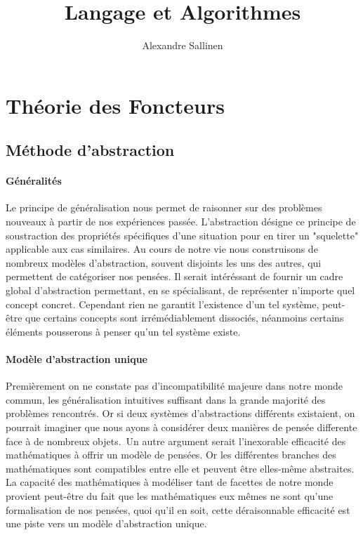 \documentclass[10pt,b5paper, french]{book}
\author{Alexandre Sallinen}
\title{Langage et Algorithmes}
\begin{document}
\maketitle	

\tableofcontents

\chapter{Théorie des Foncteurs}

\section{Méthode d'abstraction}
\subsubsection{Généralités}

Le principe de généralisation nous permet de raisonner sur des problèmes nouveaux à partir de nos expériences passée. L'abstraction désigne ce principe de soustraction des propriétés spécifiques d'une situation pour en tirer un "squelette" applicable aux cas similaires. Au cours de notre vie nous construisons de nombreux modèles d'abstraction, souvent disjoints les uns des autres, qui permettent de catégoriser nos pensées. Il serait intéréssant de fournir un cadre global d'abstraction permettant, en se spécialisant, de représenter n'importe quel concept concret. Cependant rien ne garantit l'existence d'un tel système, peut-être que certains concepts sont irrémédiablement dissociés, néanmoins certains éléments pousserons à penser qu'un tel système existe. 

\subsubsection{Modèle d'abstraction unique}

Premièrement on ne constate pas d'incompatibilité majeure dans notre monde commun, les généralisation intuitives suffisant dans la grande majorité des problèmes rencontrés. Or si deux systèmes d'abstractions différents existaient, on pourrait imaginer que nous ayons à considérer deux manières de pensée differente face à de nombreux objets.\
Un autre argument serait l'inexorable efficacité des mathématiques à offrir un modèle de pensées. Or les différentes branches des mathématiques sont compatibles entre elle et peuvent être elles-même abstraites. La capacité des mathématiques à modéliser tant de facettes de notre monde provient peut-être du fait que les mathématiques eux mêmes ne sont qu'une formalisation de nos pensées, quoi qu'il en soit, cette déraisonnable efficacité est une piste vers un modèle d'abstraction unique.
\end{document}
